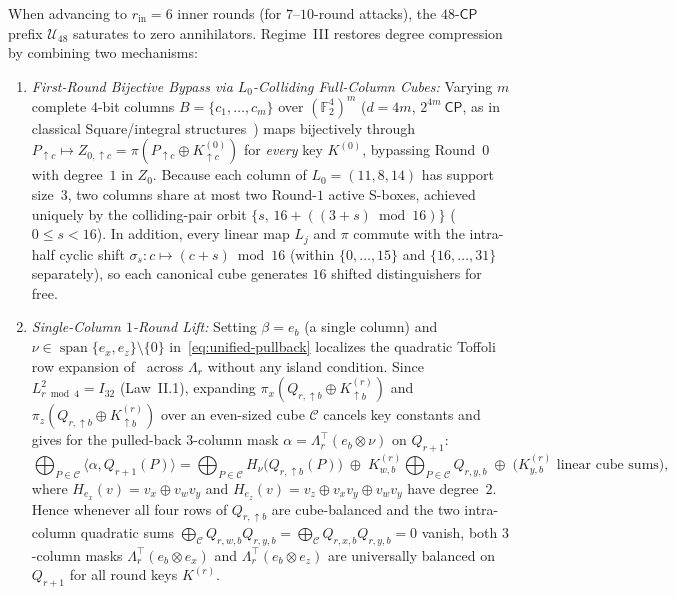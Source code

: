 \documentclass[11pt,a4paper]{article}
\theoremstyle{definition}
\theoremstyle{remark}
\newcommand{\Ftwo}{\mathbb{F}_2}
\newcommand{\spanF}{\operatorname{span}}
\newcommand{\CP}{\mathsf{CP}}
\begin{document}
When advancing to $r_{\text{in}} = 6$ inner rounds (for $7$--$10$-round attacks), the $48\text{-}\CP$ prefix $\mathcal{U}_{48}$ saturates to zero annihilators. Regime~III restores degree compression by combining two mechanisms:
\begin{enumerate}[label=(\arabic*),leftmargin=1.8em,nosep]
    \item \emph{First-Round Bijective Bypass via $L_0$-Colliding Full-Column Cubes:} Varying $m$ complete $4$-bit columns $B = \{c_1, \dots, c_m\}$ over $(\Ftwo^4)^m$ ($d = 4m$, $2^{4m}~\CP$, as in classical Square/integral structures~\cite{KW02}) maps bijectively through $P_{\uparrow c} \mapsto Z_{0,\uparrow c} = \pi(P_{\uparrow c} \oplus K^{(0)}_{\uparrow c})$ for \emph{every} key $K^{(0)}$, bypassing Round~$0$ with degree~$1$ in $Z_0$. Because each column of $L_0 = (11, 8, 14)$ has support size~$3$, two columns share at most two Round-$1$ active S-boxes, achieved uniquely by the colliding-pair orbit $\{s,\, 16 + ((3 + s)\bmod 16)\}$ ($0 \le s < 16$). In addition, every linear map $L_j$ and $\pi$ commute with the intra-half cyclic shift $\sigma_s: c \mapsto (c + s)\bmod 16$ (within $\{0,\dots,15\}$ and $\{16,\dots,31\}$ separately), so each canonical cube generates $16$ shifted distinguishers for free.
    \item \emph{Single-Column $1$-Round Lift:} Setting $\beta = e_b$ (a single column) and $\nu \in \spanF\{e_x, e_z\}\setminus\{0\}$ in~\eqref{eq:unified-pullback} localizes the quadratic Toffoli row expansion of~\cite{BRRT25} across $\Lambda_r$ without any island condition. Since $L_{r\bmod 4}^2 = I_{32}$ (Law~II.1), expanding $\pi_x(Q_{r,\uparrow b} \oplus K^{(r)}_{\uparrow b})$ and $\pi_z(Q_{r,\uparrow b} \oplus K^{(r)}_{\uparrow b})$ over an even-sized cube $\mathcal{C}$ cancels key constants and gives for the pulled-back $3$-column mask $\alpha = \Lambda_r^\top(e_b \otimes \nu)$ on $Q_{r+1}$:
    \[
    \bigoplus_{P \in \mathcal{C}} \langle \alpha, Q_{r+1}(P) \rangle
    = \bigoplus_{P \in \mathcal{C}} H_\nu\bigl(Q_{r,\uparrow b}(P)\bigr)
    \;\oplus\; K^{(r)}_{w,b}\!\bigoplus_{P \in \mathcal{C}} Q_{r,y,b}
    \;\oplus\; \bigl(K^{(r)}_{y,b} \text{ linear cube sums}\bigr),
    \]
    where $H_{e_x}(v) = v_x \oplus v_w v_y$ and $H_{e_z}(v) = v_z \oplus v_x v_y \oplus v_w v_y$ have degree~$2$. Hence whenever all four rows of $Q_{r,\uparrow b}$ are cube-balanced and the two intra-column quadratic sums $\bigoplus_{\mathcal{C}} Q_{r,w,b}Q_{r,y,b} = \bigoplus_{\mathcal{C}} Q_{r,x,b}Q_{r,y,b} = 0$ vanish, both $3$-column masks $\Lambda_r^\top(e_b \otimes e_x)$ and $\Lambda_r^\top(e_b \otimes e_z)$ are universally balanced on $Q_{r+1}$ for all round keys $K^{(r)}$.
\end{enumerate}
\end{document}
